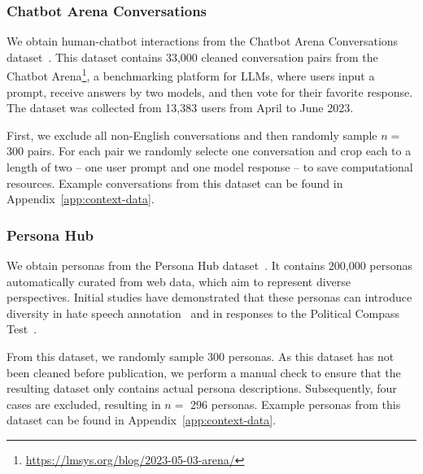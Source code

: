 \documentclass{DESSThesis}
\begin{document}
\subsubsection{Chatbot Arena Conversations}


We obtain human-chatbot interactions from the Chatbot Arena Conversations dataset~\cite{zheng_judging_2023}. This dataset contains 33,000 cleaned conversation pairs from the Chatbot Arena\footnote{\url{https://lmsys.org/blog/2023-05-03-arena/}}, a benchmarking platform for LLMs, where users input a prompt, receive answers by two models, and then vote for their favorite response. The dataset was collected from 13,383 users from April to June 2023. 

First, we exclude all non-English conversations and then randomly sample $n =$ 300 pairs. For each pair we randomly selecte one conversation and crop each to a length of two -- one user prompt and one model response -- to save computational resources. Example conversations from this dataset can be found in Appendix~\ref{app:context-data}.

\subsubsection{Persona Hub}


We obtain personas from the Persona Hub dataset~\cite{ge_scaling_2024}. It contains 200,000 personas automatically curated from web data, which aim to represent diverse perspectives.
Initial studies have demonstrated that these personas can introduce diversity in hate speech annotation~\cite{frohling_personas_2024} and in responses to the Political Compass Test~\cite{bernardelle_mapping_2024}.

From this dataset, we randomly sample 300 personas. As this dataset has not been cleaned before publication, we perform a manual check to ensure that the resulting dataset only contains actual persona descriptions. Subsequently, four cases are excluded, resulting in $n =$ 296 personas. Example personas from this dataset can be found in Appendix~\ref{app:context-data}.
\end{document}
